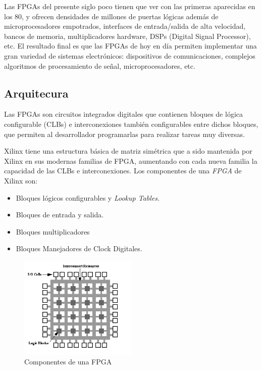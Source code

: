 Las FPGAs del presente siglo poco tienen que ver con las primeras aparecidas en los 80, y ofrecen densidades de millones de puertas lógicas además de microprocesadores empotrados, interfaces de entrada/salida de alta velocidad, bancos de memoria, multiplicadores hardware, DSPs (Digital Signal Processor), etc. El resultado final es que las FPGAs de hoy en día permiten implementar una gran variedad de sistemas electrónicos: dispositivos de comunicaciones, complejos algoritmos de procesamiento de señal, microprocesadores, etc.


	\subsection{Arquitecura}

Las FPGAs son circuitos integrados digitales que contienen bloques de lógica
configurable (CLBs) e interconexiones también configurables entre dichos bloques,
que permiten al desarrollador programarlas para realizar tareas muy diversas.


Xilinx tiene una estructura básica de matriz simétrica que a sido mantenida por Xilinx en sus modernas familias de FPGA, aumentando con cada nueva familia la capacidad de las CLBs e interconexiones. 
Los componentes de una \textit{FPGA} de Xilinx son:

\begin {itemize}
\item  Bloques lógicos configurables y \textit{Lookup Tables}.
\item  Bloques de entrada y salida.
\item  Bloques multiplicadores
\item  Bloques Manejadores de Clock Digitales.
 \end {itemize}


\begin{figure}[h!]
 \begin{center}
   \includegraphics[width=0.5\textwidth,keepaspectratio=true]{./images/fpga1a}
  \caption{Componentes de una FPGA}
  \label{fig:esquema}
 \end{center}
\end{figure}


